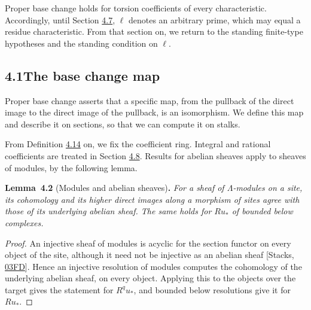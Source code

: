 \documentclass[11pt]{article}
\newenvironment{bpstatement}[2]{\par\addvspace{0.6\baselineskip}\noindent\textbf{#1}#2\textbf{.}\enspace\ignorespaces}
  {\par\addvspace{0.4\baselineskip}}
\newenvironment{bpstatementit}[2]{\begin{bpstatement}{#1}{#2}\itshape\ignorespaces}{\end{bpstatement}}
\begin{document}
Proper base change holds for torsion coefficients of every characteristic. Accordingly, until Section \hyperref[bp388]{4.7}, \(\ell\) denotes an arbitrary prime, which may equal a residue characteristic. From that section on, we return to the standing finite-type hypotheses and the standing condition on \(\ell\).

\subsection*{\texorpdfstring{4.1\quad The base change map}{4.1 The base change map}}
\label{bp290}%
\label{bp291}%
Proper base change asserts that a specific map, from the pullback of the direct image to the direct image of the pullback, is an isomorphism. We define this map and describe it on sections, so that we can compute it on stalks.

From Definition \hyperref[bp322]{4.14} on, we fix the coefficient ring. Integral and rational coefficients are treated in Section \hyperref[bp392]{4.8}. Results for abelian sheaves apply to sheaves of modules, by the following lemma.

\label{bp292}%
\begin{bpstatementit}{Lemma~4.2}{ (Modules and abelian sheaves)}
For a sheaf of \(\Lambda\)-modules on a site, its cohomology and its higher direct images along a morphism of sites agree with those of its underlying abelian sheaf. The same holds for \(Ru_*\) of bounded below complexes.
\end{bpstatementit}

\begin{proof}[{Proof}]\label{bp293}%
An injective sheaf of modules is acyclic for the section functor on every object of the site, although it need not be injective as an abelian sheaf [Stacks, \href{https://stacks.math.columbia.edu/tag/03FD}{03FD}]. Hence an injective resolution of modules computes the cohomology of the underlying abelian sheaf, on every object. Applying this to the objects over the target gives the statement for \(R^qu_*\), and bounded below resolutions give it for \(Ru_*\).
\end{proof}
\end{document}
